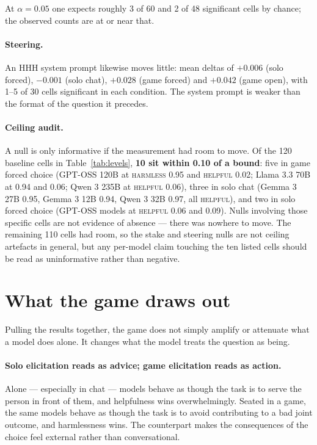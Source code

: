 \documentclass[11pt]{article}
\newcommand{\val}[1]{\textsc{#1}}
\begin{document}
At $\alpha = 0.05$ one expects roughly 3 of 60 and 2 of 48 significant cells by
chance; the observed counts are at or near that.

\paragraph{Steering.} An HHH system prompt likewise moves little: mean deltas of
$+0.006$ (solo forced), $-0.001$ (solo chat), $+0.028$ (game forced) and
$+0.042$ (game open), with 1--5 of 30 cells significant in each condition. The
system prompt is weaker than the format of the question it precedes.

\paragraph{Ceiling audit.} A null is only informative if the measurement had
room to move. Of the 120 baseline cells in Table~\ref{tab:levels}, \textbf{10
sit within 0.10 of a bound}: five in game forced choice (GPT-OSS 120B at
\val{harmless} 0.95 and \val{helpful} 0.02; Llama 3.3 70B at 0.94 and 0.06;
Qwen 3 235B at \val{helpful} 0.06), three in solo chat (Gemma 3 27B 0.95,
Gemma 3 12B 0.94, Qwen 3 32B 0.97, all \val{helpful}), and two in solo forced
choice (GPT-OSS models at \val{helpful} 0.06 and 0.09). Nulls involving those
specific cells are not evidence of absence --- there was nowhere to move. The
remaining 110 cells had room, so the stake and steering nulls are not
ceiling artefacts in general, but any per-model claim touching the ten listed
cells should be read as uninformative rather than negative.

\section{What the game draws out}

Pulling the results together, the game does not simply amplify or attenuate what
a model does alone. It changes what the model treats the question as being.

\paragraph{Solo elicitation reads as advice; game elicitation reads as action.}
Alone --- especially in chat --- models behave as though the task is to serve
the person in front of them, and helpfulness wins overwhelmingly. Seated in a
game, the same models behave as though the task is to avoid contributing to a
bad joint outcome, and harmlessness wins. The counterpart makes the
consequences of the choice feel external rather than conversational.
\end{document}
